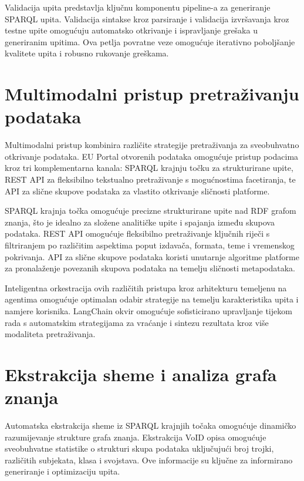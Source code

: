 Validacija upita predstavlja ključnu komponentu pipeline-a za generiranje SPARQL upita. Validacija sintakse kroz parsiranje i validacija izvršavanja kroz testne upite omogućuju automatsko otkrivanje i ispravljanje grešaka u generiranim upitima. Ova petlja povratne veze omogućuje iterativno poboljšanje kvalitete upita i robusno rukovanje greškama.

\section{Multimodalni pristup pretraživanju podataka}
\label{sec:multimodal_search}

Multimodalni pristup kombinira različite strategije pretraživanja za sveobuhvatno otkrivanje podataka. EU Portal otvorenih podataka omogućuje pristup podacima kroz tri komplementarna kanala: SPARQL krajnju točku za strukturirane upite, REST API za fleksibilno tekstualno pretraživanje s mogućnostima facetiranja, te API za slične skupove podataka za vlastito otkrivanje sličnosti platforme.

SPARQL krajnja točka omogućuje precizne strukturirane upite nad RDF grafom znanja, što je idealno za složene analitičke upite i spajanja između skupova podataka. REST API omogućuje fleksibilno pretraživanje ključnih riječi s filtriranjem po različitim aspektima poput izdavača, formata, teme i vremenskog pokrivanja. API za slične skupove podataka koristi unutarnje algoritme platforme za pronalaženje povezanih skupova podataka na temelju sličnosti metapodataka.

Inteligentna orkestracija ovih različitih pristupa kroz arhitekturu temeljenu na agentima omogućuje optimalan odabir strategije na temelju karakteristika upita i namjere korisnika. LangChain okvir omogućuje sofisticirano upravljanje tijekom rada s automatskim strategijama za vraćanje i sintezu rezultata kroz više modaliteta pretraživanja.

\section{Ekstrakcija sheme i analiza grafa znanja}
\label{sec:schema_extraction}

Automatska ekstrakcija sheme iz SPARQL krajnjih točaka omogućuje dinamičko razumijevanje strukture grafa znanja. Ekstrakcija VoID opisa omogućuje sveobuhvatne statistike o strukturi skupa podataka uključujući broj trojki, različitih subjekata, klasa i svojstava. Ove informacije su ključne za informirano generiranje i optimizaciju upita.

